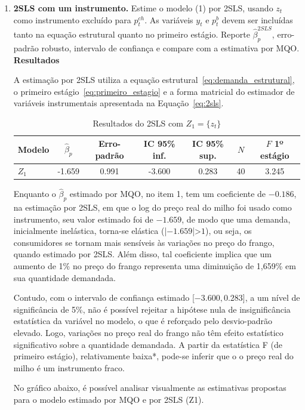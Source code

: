 \documentclass[12pt,a4paper]{article}
\begin{document}
\begin{enumerate}[label=\textbf{\arabic*.}]
\item \textbf{2SLS com um instrumento.} Estime o modelo (1) por 2SLS, usando
    $z_t$ como instrumento excluído para $p_t^{ch}$. As variáveis $y_t$ e $p_t^b$
    devem ser incluídas tanto na equação estrutural quanto no primeiro estágio.
    Reporte $\hat{\beta}^{2SLS}_p$, erro-padrão robusto, intervalo de confiança e compare com a estimativa por MQO.\\

\textbf{Resultados}

A estimação por 2SLS utiliza a equação estrutural~\eqref{eq:demanda_estrutural}, o primeiro estágio~\eqref{eq:primeiro_estagio} e a forma matricial do estimador de variáveis instrumentais apresentada na Equação~\eqref{eq:2sls}.
\begin{table}[H]
    \centering
    \caption{Resultados do 2SLS com $Z_1 = \{z_t\}$}
    \label{tab:2sls_z1}
    \begin{tabular}{lcccccc}
        \hline
        Modelo & $\hat{\beta}_p$ & Erro-padrão & IC 95\% inf. & IC 95\% sup. & $N$ & $F$ 1º estágio \\
        \hline
        $Z_1$ & -1.659 & 0.991 & -3.600 & 0.283 & 40 & 3.245 \\
        \hline
    \end{tabular}
\end{table}

Enquanto o $\hat{\beta}_p$ estimado por MQO, no item 1, tem um coeficiente de $-0.186$, na estimação por 2SLS, em que o log do preço real do milho foi usado como instrumento, seu valor estimado foi de $-1.659$, de modo que uma demanda, inicialmente inelástica, torna-se elástica (|$-1.659$|>$1$), ou seja, os consumidores se tornam mais sensíveis às variações no preço do frango, quando estimado por 2SLS. Além disso, tal coeficiente implica que um aumento de 1\% no preço do frango representa uma diminuição de 1,659\% em sua quantidade demandada.

Contudo, com o intervalo de confiança estimado [$-3.600, 0.283$], a um nível de significância de 5\%, não é possível rejeitar a hipótese nula de insignificância estatística da variável no modelo, o que é reforçado pelo desvio-padrão elevado. Logo, variações no preço real do frango não têm efeito estatístico significativo sobre a quantidade demandada. A partir da estatística F (de primeiro estágio), relativamente baixa*, pode-se inferir que o o preço real do milho é um instrumento fraco.

No gráfico abaixo, é possível analisar visualmente as estimativas propostas para o modelo estimado por MQO e por 2SLS (Z1).


\end{enumerate}
\end{document}
